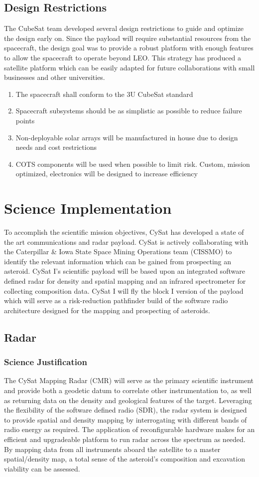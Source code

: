 \documentclass[nocover]            %
{CSLI}                       %
\begin{document}
\subsection{Design Restrictions}
The CubeSat team developed several design restrictions to guide and optimize the design early on. Since the payload will require substantial resources from the spacecraft, the design goal was to provide a robust platform with enough features to allow the spacecraft to operate beyond LEO. This strategy has produced a satellite platform which can be easily adapted for future collaborations with small businesses and other universities.
\begin{enumerate}
\item The spacecraft shall conform to the 3U CubeSat standard
\item Spacecraft subsystems should be as simplistic as possible to reduce failure points
\item Non-deployable solar arrays will be manufactured in house due to design needs and cost restrictions
\item COTS components will be used when possible to limit risk. Custom, mission optimized, electronics will be designed to increase efficiency
\end{enumerate}

\section{Science Implementation}
To accomplish the scientific mission objectives, CySat has developed a state of the art communications and radar payload. CySat is actively collaborating with the Caterpillar \& Iowa State Space Mining Operations team (CISSMO) to identify the relevant information which can be gained from prospecting an asteroid. CySat I's scientific payload will be based upon an integrated software defined radar for density and spatial mapping and an infrared spectrometer for collecting composition data. CySat I will fly the block I version of the payload which will serve as a risk-reduction pathfinder build of the software radio architecture designed for the mapping and prospecting of asteroids.
\subsection{Radar}
\subsubsection{Science Justification}
The CySat Mapping Radar (CMR) will serve as the primary scientific instrument and provide both a geodetic datum to correlate other instrumentation to, as well as returning data on the density and geological features of the target. Leveraging the flexibility of the software defined radio (SDR), the radar system is designed to provide spatial and density mapping by interrogating with different bands of radio energy as required. The application of reconfigurable hardware makes for an efficient and upgradeable platform to run radar across the spectrum as needed. By mapping data from all instruments aboard the satellite to a master spatial/density map, a total sense of the asteroid's composition and excavation viability can be assessed.
\end{document}
